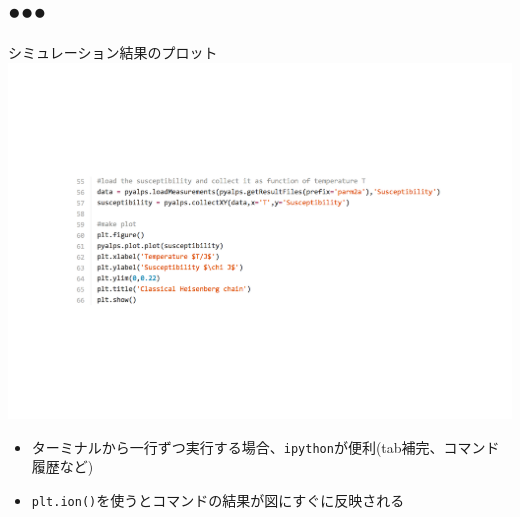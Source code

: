 \subsection*{{\protect\color{red}●}{\protect\color{blue}●}{\protect\color{green}●}}

\begin{frame}[t,fragile]{シミュレーション結果のプロット}
  \includegraphics[height=.5\textheight]{tutorial2a-3.pdf}
  \begin{itemize}
  \item ターミナルから一行ずつ実行する場合、{\color{red}\tt ipython}が便利(tab補完、コマンド履歴など)
  \item {\color{red}\tt plt.ion()}を使うとコマンドの結果が図にすぐに反映される
  \end{itemize}
\end{frame}

